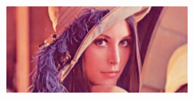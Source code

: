 \begin{titlepage}
  \begin{addmargin}[-1cm]{-3cm}
    \begin{center}
      \large  
      
      \hfill
      
      \vfill
      
      \begingroup
      \color{Maroon}\spacedallcaps{\ourTitle} \\ 
      \endgroup
      \begingroup
      \small {} \\ \bigskip
      \endgroup
      
      {\sc \ourNames}
      
      \vfill
      
      \includegraphics[width=6cm]{gfx/killinglena} \\
      
      \vfill
      
      \ourProject \\
      \ourDept \\                            
      \ourFaculty \\
      \ourUni \\ \bigskip
      
      \vfill                      
      
    \end{center}  
  \end{addmargin}
\end{titlepage}
